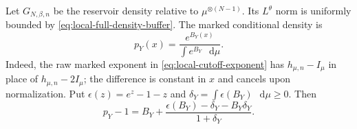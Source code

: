 \documentclass[11pt,reqno]{amsart}
\numberwithin{equation}{section}
\theoremstyle{plain}
\theoremstyle{definition}
\newcommand{\dd}{\mathop{}\!\mathrm d}
\newcommand{\be}{\beta}
\begin{document}
Let $G_{N,\be,n}$ be the reservoir density relative to $\mu^{\otimes(N-1)}$. Its $L^\theta$ norm is uniformly bounded by \eqref{eq:local-full-density-buffer}. The marked conditional density is
\begin{equation}
 p_Y(x)=\frac{e^{B_Y(x)}}{\int e^{B_Y}\,\dd\mu}.
 \label{eq:local-marked-conditional-density}
\end{equation}
Indeed, the raw marked exponent in \eqref{eq:local-cutoff-exponent} has $h_{\mu,n}-I_\mu$ in place of $h_{\mu,n}-2I_\mu$; the difference is constant in $x$ and cancels upon normalization. Put $\epsilon(z)=e^z-1-z$ and $\delta_Y=\int\epsilon(B_Y)\,\dd\mu\geq0$. Then
\begin{equation}
 p_Y-1=B_Y+
 \frac{\epsilon(B_Y)-\delta_Y-B_Y\delta_Y}{1+\delta_Y}.
 \label{eq:local-normalized-exponential-identity}
\end{equation}
\end{document}
